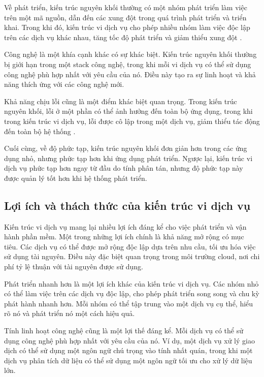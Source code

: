 Về phát triển, kiến trúc nguyên khối thường có một nhóm phát triển làm việc
trên một mã nguồn, dẫn đến các xung đột trong quá trình phát triển và triển
khai. Trong khi đó, kiến trúc vi dịch vụ cho phép nhiều nhóm làm việc độc lập
trên các dịch vụ khác nhau, tăng tốc độ phát triển và giảm thiểu xung đột \cite{richardson2019}.

Công nghệ là một khía cạnh khác có sự khác biệt. Kiến trúc nguyên khối thường
bị giới hạn trong một stack công nghệ, trong khi mỗi vi dịch vụ có thể sử
dụng công nghệ phù hợp nhất với yêu cầu của nó. Điều này tạo ra sự linh hoạt và
khả năng thích ứng với các công nghệ mới.

Khả năng chịu lỗi cũng là một điểm khác biệt quan trọng. Trong kiến trúc nguyên
khối, lỗi ở một phần có thể ảnh hưởng đến toàn bộ ứng dụng, trong khi trong
kiến trúc vi dịch vụ, lỗi được cô lập trong một dịch vụ, giảm thiểu tác động
đến toàn bộ hệ thống \cite{fowler2014}.

Cuối cùng, về độ phức tạp, kiến trúc nguyên khối đơn giản hơn trong các ứng
dụng nhỏ, nhưng phức tạp hơn khi ứng dụng phát triển. Ngược lại, kiến trúc
vi dịch vụ phức tạp hơn ngay từ đầu do tính phân tán, nhưng độ phức tạp này
được quản lý tốt hơn khi hệ thống phát triển.

\subsection{Lợi ích và thách thức của kiến trúc vi dịch vụ}
Kiến trúc vi dịch vụ mang lại nhiều lợi ích đáng kể cho việc phát triển và
vận hành phần mềm. Một trong những lợi ích chính là khả năng mở rộng có mục
tiêu. Các dịch vụ có thể được mở rộng độc lập dựa trên nhu cầu, tối ưu hóa việc
sử dụng tài nguyên. Điều này đặc biệt quan trọng trong môi trường cloud, nơi
chi phí tỷ lệ thuận với tài nguyên được sử dụng.

Phát triển nhanh hơn là một lợi ích khác của kiến trúc vi dịch vụ. Các nhóm
nhỏ có thể làm việc trên các dịch vụ độc lập, cho phép phát triển song song và
chu kỳ phát hành nhanh hơn. Mỗi nhóm có thể tập trung vào một dịch vụ cụ thể,
hiểu rõ nó và phát triển nó một cách hiệu quả.

Tính linh hoạt công nghệ cũng là một lợi thế đáng kể. Mỗi dịch vụ có thể sử
dụng công nghệ phù hợp nhất với yêu cầu của nó. Ví dụ, một dịch vụ xử lý giao
dịch có thể sử dụng một ngôn ngữ chú trọng vào tính nhất quán, trong khi một
dịch vụ phân tích dữ liệu có thể sử dụng một ngôn ngữ tối ưu cho xử lý dữ liệu
lớn.

